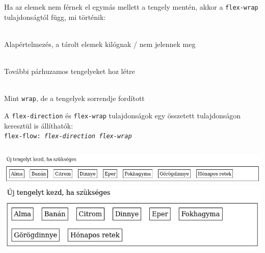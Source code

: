 %
\begin{frame}
  Ha az elemek nem férnek el egymás mellett a tengely mentén, akkor a \texttt{flex-wrap} tulajdonságtól függ, mi történik:
  \begin{description}[m]
    \item[\texttt{nowrap}] \hfill \\ Alapértelmezés, a tárolt elemek kilógnak / nem jelennek meg
    \item[\texttt{wrap}] \hfill \\ További párhuzamos tengelyeket hoz létre
    \item[\texttt{wrap-reverse}] \hfill \\ Mint \texttt{wrap}, de a tengelyek sorrendje fordított
  \end{description}
  \vfill
  A \texttt{flex-direction} és \texttt{flex-wrap} tulajdonságok egy összetett tulajdonságon keresztül is állíthatók: \\
  \texttt{flex-flow: \emph{flex-direction flex-wrap}}
\end{frame}

%
\begin{frame}
  \begin{exampleblock}{}
    \scriptsize
    
    
  \end{exampleblock}
  \begin{columns}
      \includegraphics[width=\textwidth]{flex-wrap1.png}
      \includegraphics[width=\textwidth]{flex-wrap2.png}
  \end{columns}
\end{frame}

